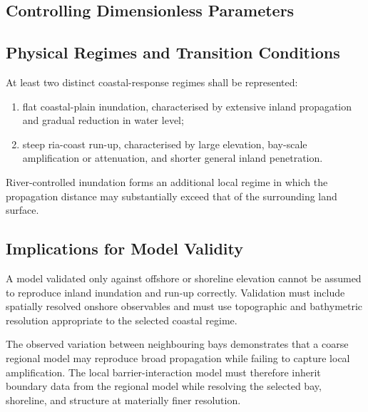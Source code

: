 \subsection{Controlling Dimensionless Parameters}
\label{sec:res-phy-nrs-controlling-dimensionless-parameters}


\subsection{Physical Regimes and Transition Conditions}
\label{sec:res-phy-nrs-physical-regimes-transition-conditions}


At least two distinct coastal-response regimes shall be represented:
\begin{enumerate}
  \item flat coastal-plain inundation, characterised by
    extensive inland propagation and gradual reduction in water level;
  \item steep
    ria-coast run-up, characterised by large elevation, bay-scale amplification or
    attenuation, and shorter general inland penetration.
\end{enumerate}
River-controlled inundation forms an additional local regime in which the
propagation distance may substantially exceed that of the surrounding land
surface.

\subsection{Implications for Model Validity}
\label{sec:res-phy-nrs-model-validity-implications}


A model validated only against offshore or shoreline elevation cannot be assumed to reproduce inland inundation and run-up correctly. Validation must include spatially resolved onshore observables and must use topographic and bathymetric resolution appropriate to the selected coastal regime. 

The observed variation between neighbouring bays demonstrates that a coarse regional model may reproduce broad propagation while failing to capture local amplification. The local barrier-interaction model must therefore inherit boundary data from the regional model while resolving the selected bay, shoreline, and structure at materially finer resolution.

